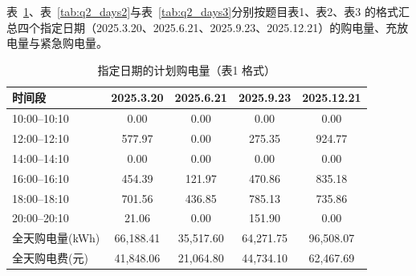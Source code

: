 \documentclass[zihao=-4,a4paper,UTF8,fontset=none]{ctexart}
\begin{document}
表~\ref{tab:q2_days}、表~\ref{tab:q2_days2}与表~\ref{tab:q2_days3}分别按题目表1、表2、表3 的格式汇总四个指定日期（2025.3.20、2025.6.21、2025.9.23、2025.12.21）的购电量、充放电量与紧急购电量。

\begin{table}[H]
  \centering
  \caption{指定日期的计划购电量（表1 格式）}
  \label{tab:q2_days}
  \small
  \begin{tabular}{lcccc}
    \toprule
    时间段 & 2025.3.20 & 2025.6.21 & 2025.9.23 & 2025.12.21 \\
    \midrule
    10:00--10:10  & 0.00 & 0.00 & 0.00 & 0.00 \\
    12:00--12:10  & 577.97 & 0.00 & 275.35 & 924.77 \\
    14:00--14:10  & 0.00 & 0.00 & 0.00 & 0.00 \\
    16:00--16:10  & 454.39 & 121.97 & 470.86 & 835.18 \\
    18:00--18:10  & 701.56 & 436.85 & 785.13 & 735.86 \\
    20:00--20:10  & 21.06 & 0.00 & 151.90 & 0.00 \\
    \midrule
    全天购电量(kWh) & 66,188.41 & 35,517.60 & 64,271.75 & 96,508.07 \\
    全天购电费(元) & 41,848.06 & 21,064.80 & 44,734.10 & 62,467.69 \\
    \bottomrule
  \end{tabular}
\end{table}
\end{document}
